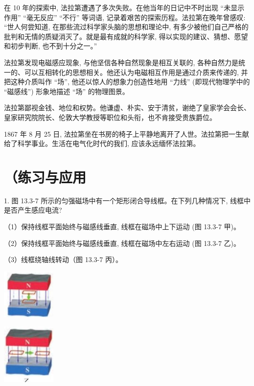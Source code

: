 \documentclass[10pt]{article}
\begin{document}
在 10 年的探索中, 法拉第遭遇了多次失败。在他当年的日记中不时出现 “未显示作用” “毫无反应” “不行” 等词语, 记录着艰苦的探索历程。法拉第在晚年曾感叹: “世人何尝知道, 在那些流过科学家头脑的思想和理论中, 有多少被他们自己严格的批判和无情的质疑消灭了。就是最有成就的科学家, 得以实现的建议、猜想、愿望和初步判断, 也不到十分之一。”

法拉第发现电磁感应现象, 与他坚信各种自然现象是相互关联的, 各种自然力是统一的、可以互相转化的思想相关。他还认为电磁相互作用是通过介质来传递的, 并把这种介质叫作 “场”, 他还以惊人的想象力创造性地用 “力线” (即现代物理学中的 “磁感线”) 形象地描述 “场” 的物理图景。

法拉第鄙视金钱、地位和权势。他谦虚、朴实、安于清贫，谢绝了皇家学会会长、皇家研究院院长、伦敦大学教授等职位和头衔，也不肯接受贵族爵位。

1867 年 8 月 25 日, 法拉第坐在书房的椅子上平静地离开了人世。法拉第把一生献给了科学事业。生活在电气化时代的我们, 应该永远缅怀法拉第。

\section*{（练习与应用}

1. 图 13.3-7 所示的匀强磁场中有一个矩形闭合导线框。在下列几种情况下, 线框中是否产生感应电流?

（1）保持线框平面始终与磁感线垂直, 线框在磁场中上下运动 (图 13.3-7 甲)。

（2）保持线框平面始终与磁感线垂直, 线框在磁场中左右运动 (图 13.3-7 乙)。

（3）线框绕轴线转动（图 13.3-7 丙）。

\begin{center}
\includegraphics[max width=0.2\textwidth]{images/01911d5f-8e38-70c0-b5b8-2b399bd115b6_122_745693.jpg}
\end{center}

\begin{center}
\includegraphics[max width=0.2\textwidth]{images/01911d5f-8e38-70c0-b5b8-2b399bd115b6_122_969210.jpg}
\end{center}
\end{document}
